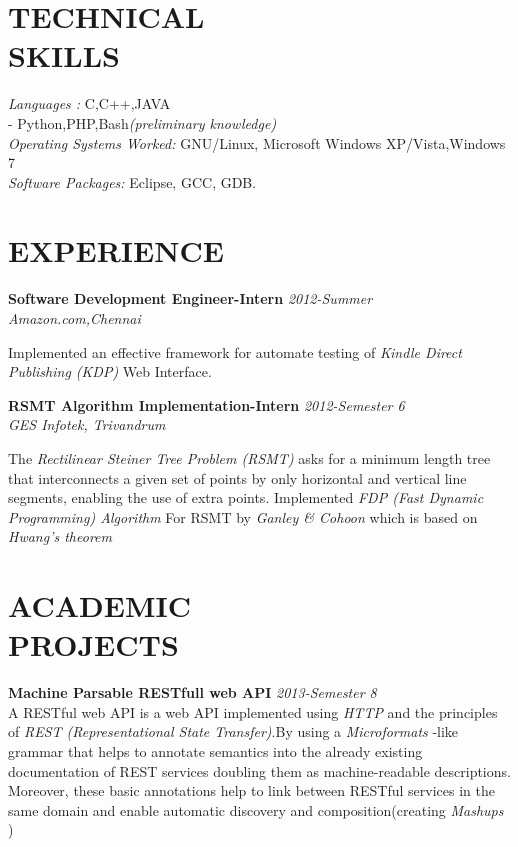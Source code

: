 \documentclass[line,margin]{res}
\begin{document}
\begin{resume}
	  \section{TECHNICAL \\ SKILLS} 
		  {\it Languages :} C,C++,JAVA\\-\hspace{15 mm} Python,PHP,Bash{\it (preliminary knowledge)}\\
		  {\it Operating Systems Worked:} GNU/Linux, Microsoft Windows XP/Vista,Windows 7\\
		  {\it Software Packages:} Eclipse, GCC, GDB.\\
	  \section{EXPERIENCE}
		  {\bf Software Development Engineer-Intern }\hfill {\it 2012-Summer } \\
		  {\it Amazon.com,Chennai }
		  
		  Implemented an effective framework for automate testing of {\it Kindle Direct Publishing (KDP)} Web Interface.
		  
		  {\bf RSMT Algorithm Implementation-Intern }\hfill {\it 2012-Semester 6 } \\
		  {\it GES Infotek, Trivandrum }
		  
		  The {\it Rectilinear Steiner Tree Problem (RSMT)} asks for a minimum length tree that interconnects a given set of points by only horizontal and vertical line segments, enabling the use of extra points. Implemented {\it FDP (Fast Dynamic Programming) Algorithm } For RSMT by {\it Ganley \& Cohoon } which is based on {\it Hwang’s theorem}\\
	  \section{ACADEMIC \\ PROJECTS}
	    	  {\bf Machine Parsable RESTfull web API }\hfill {\it 2013-Semester 8}\\
	          
	    	  A RESTful web API is a web API implemented using {\it HTTP }and the principles of {\it REST (Representational State Transfer)}.By using  a {\it Microformats }-like grammar that helps to annotate semantics into the already existing documentation of REST services doubling them as machine-readable descriptions. Moreover, these basic annotations help to link between RESTful services in the same domain and enable automatic discovery and composition(creating {\it Mashups }) \\


\end{resume}
\end{document}
